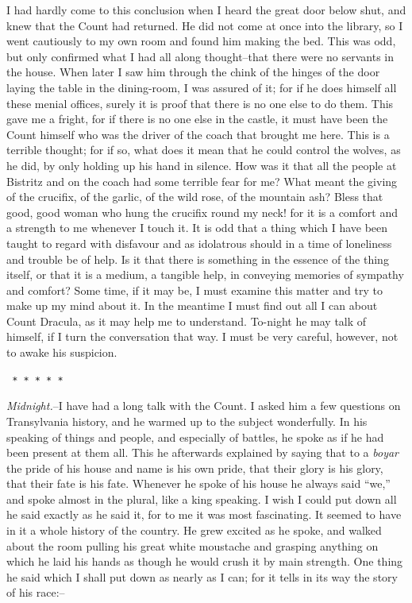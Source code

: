 \documentclass[12pt,openright]{book}
\begin{document}
I had hardly come to this conclusion when I heard the great door below shut, and knew that the Count had returned. He did not come at once into the library, so I went cautiously to my own room and found him making the bed. This was odd, but only confirmed what I had all along thought–that there were no servants in the house. When later I saw him through the chink of the hinges of the door laying the table in the dining-room, I was assured of it; for if he does himself all these menial offices, surely it is proof that there is no one else to do them. This gave me a fright, for if there is no one else in the castle, it must have been the Count himself who was the driver of the coach that brought me here. This is a terrible thought; for if so, what does it mean that he could control the wolves, as he did, by only holding up his hand in silence. How was it that all the people at Bistritz and on the coach had some terrible fear for me? What meant the giving of the crucifix, of the garlic, of the wild rose, of the mountain ash? Bless that good, good woman who hung the crucifix round my neck! for it is a comfort and a strength to me whenever I touch it. It is odd that a thing which I have been taught to regard with disfavour and as idolatrous should in a time of loneliness and trouble be of help. Is it that there is something in the essence of the thing itself, or that it is a medium, a tangible help, in conveying memories of sympathy and comfort? Some time, if it may be, I must examine this matter and try to make up my mind about it. In the meantime I must find out all I can about Count Dracula, as it may help me to understand. To-night he may talk of himself, if I turn the conversation that way. I must be very careful, however, not to awake his suspicion.

\texttt{   *       *       *       *       *}

\textit{Midnight.}–I have had a long talk with the Count. I asked him a few questions on Transylvania history, and he warmed up to the subject wonderfully. In his speaking of things and people, and especially of battles, he spoke as if he had been present at them all. This he afterwards explained by saying that to a \textit{boyar} the pride of his house and name is his own pride, that their glory is his glory, that their fate is his fate. Whenever he spoke of his house he always said “we,” and spoke almost in the plural, like a king speaking. I wish I could put down all he said exactly as he said it, for to me it was most fascinating. It seemed to have in it a whole history of the country. He grew excited as he spoke, and walked about the room pulling his great white moustache and grasping anything on which he laid his hands as though he would crush it by main strength. One thing he said which I shall put down as nearly as I can; for it tells in its way the story of his race:–
\end{document}
